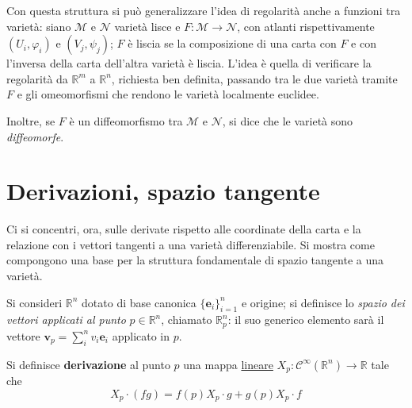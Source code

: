 
Con questa struttura si può generalizzare l'idea di regolarità anche a funzioni tra varietà: siano $\mathcal{M}$ e $\mathcal{N}$ varietà lisce e $F : \mathcal{M} \rightarrow \mathcal{N}$, con atlanti rispettivamente $(U_i, \varphi_i)$ e $(V_j, \psi_j)$; $F$ è liscia se la composizione di una carta con $F$ e con l'inversa della carta dell'altra varietà è liscia. L'idea è quella di verificare la regolarità da $\mathbb{R}^m$ a $\mathbb{R}^n$, richiesta ben definita, passando tra le due varietà tramite $F$ e gli omeomorfismi che rendono le varietà localmente euclidee.

Inoltre, se $F$ è un diffeomorfismo tra $\mathcal{M}$ e $\mathcal{N}$, si dice che le varietà sono \emph{diffeomorfe}.

\section{Derivazioni, spazio tangente}
Ci si concentri, ora, sulle derivate rispetto alle coordinate della carta e la relazione con i vettori tangenti a una varietà differenziabile.
Si mostra come compongono una base per la struttura fondamentale di spazio tangente a una varietà. %

Si consideri $\mathbb{R}^n$ dotato di base canonica $\{ \mathbf{e}_i\}_{i=1}^n$ e origine; si definisce lo \emph{spazio dei vettori applicati al punto} $p \in \mathbb{R}^n$, chiamato $\mathbb{R}^n_p$: il suo generico elemento sarà il vettore $\mathbf{v}_p = \sum_i^n v_i\mathbf{e}_i$ applicato in $p$.

\begin{definition}
    Si definisce \textbf{derivazione} al punto $p$ una mappa \underline{lineare} $X_p : \mathcal{C}^\infty(\mathbb{R}^n) \rightarrow \mathbb{R}$ tale che
    \begin{equation} \label{eq:leibniz}
        X_p \cdot (f g) = f(p) X_p \cdot g + g(p) X_p \cdot f \tag*{Formula di Leibniz}
    \end{equation}
\end{definition}

